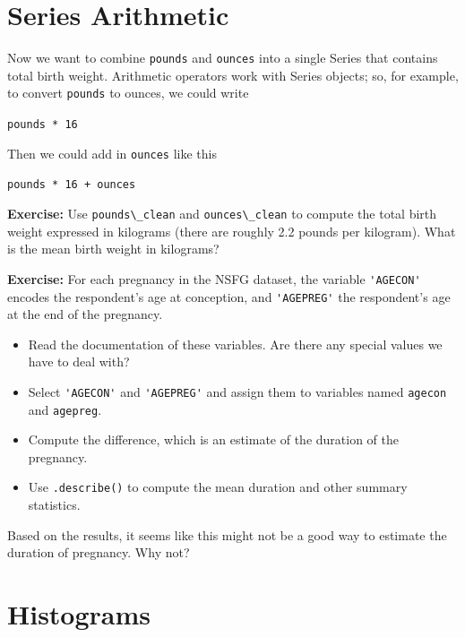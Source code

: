 \hypertarget{series-arithmetic}{%
\section{Series Arithmetic}\label{series-arithmetic}}

Now we want to combine \passthrough{\lstinline!pounds!} and
\passthrough{\lstinline!ounces!} into a single Series that contains
total birth weight. Arithmetic operators work with Series objects; so,
for example, to convert \passthrough{\lstinline!pounds!} to ounces, we
could write

\passthrough{\lstinline!pounds * 16!}

Then we could add in \passthrough{\lstinline!ounces!} like this

\passthrough{\lstinline!pounds * 16 + ounces!}

\textbf{Exercise:} Use \passthrough{\lstinline!pounds\_clean!} and
\passthrough{\lstinline!ounces\_clean!} to compute the total birth
weight expressed in kilograms (there are roughly 2.2 pounds per
kilogram). What is the mean birth weight in kilograms?

\textbf{Exercise:} For each pregnancy in the NSFG dataset, the variable
\passthrough{\lstinline!'AGECON'!} encodes the respondent's age at
conception, and \passthrough{\lstinline!'AGEPREG'!} the respondent's age
at the end of the pregnancy.

\begin{itemize}
\item
  Read the documentation of these variables. Are there any special
  values we have to deal with?
\item
  Select \passthrough{\lstinline!'AGECON'!} and
  \passthrough{\lstinline!'AGEPREG'!} and assign them to variables named
  \passthrough{\lstinline!agecon!} and
  \passthrough{\lstinline!agepreg!}.
\item
  Compute the difference, which is an estimate of the duration of the
  pregnancy.
\item
  Use \passthrough{\lstinline!.describe()!} to compute the mean duration
  and other summary statistics.
\end{itemize}

Based on the results, it seems like this might not be a good way to
estimate the duration of pregnancy. Why not?

\hypertarget{histograms}{%
\section{Histograms}\label{histograms}}

